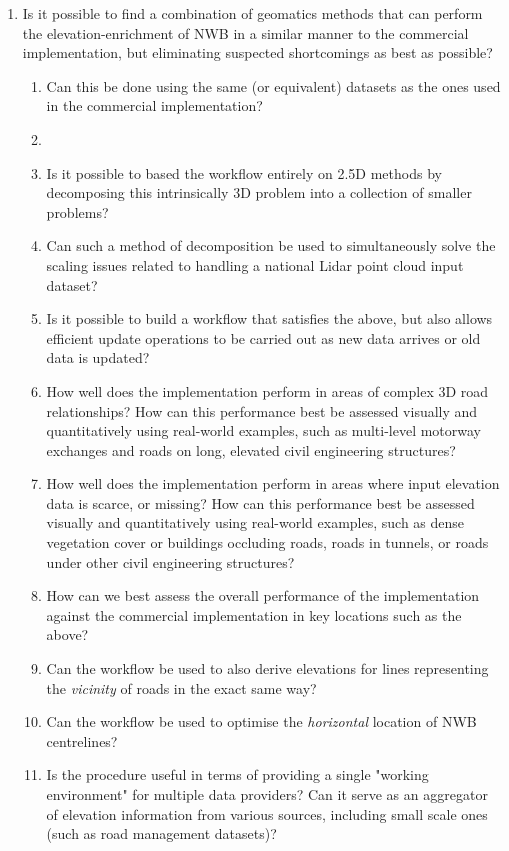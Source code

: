 \begin{enumerate}
    \item Is it possible to find a combination of geomatics methods that can perform the elevation-enrichment of NWB in a similar manner to the commercial implementation, but eliminating suspected shortcomings as best as possible?
    \begin{enumerate}
        \item Can this be done using the same (or equivalent) datasets as the ones used in the commercial implementation?
        \item 
        \item Is it possible to based the workflow entirely on 2.5D methods by decomposing this intrinsically 3D problem into a collection of smaller problems?
        \item Can such a method of decomposition be used to simultaneously solve the scaling issues related to handling a national Lidar point cloud input dataset?
        \item Is it possible to build a workflow that satisfies the above, but also allows efficient update operations to be carried out as new data arrives or old data is updated?
        \item How well does the implementation perform in areas of complex 3D road relationships? How can this performance best be assessed visually and quantitatively using real-world examples, such as multi-level motorway exchanges and roads on long, elevated civil engineering structures?
        \item How well does the implementation perform in areas where input elevation data is scarce, or missing? How can this performance best be assessed visually and quantitatively using real-world examples, such as dense vegetation cover or buildings occluding roads, roads in tunnels, or roads under other civil engineering structures?
        \item How can we best assess the overall performance of the implementation against the commercial implementation in key locations such as the above?
        \item Can the workflow be used to also derive elevations for lines representing the \textit{vicinity} of roads in the exact same way?
        \item Can the workflow be used to optimise the \textit{horizontal} location of NWB centrelines?
        \item Is the procedure useful in terms of providing a single "working environment" for multiple data providers? Can it serve as an aggregator of elevation information from various sources, including small scale ones (such as road management datasets)?

\end{enumerate}
\end{enumerate}
